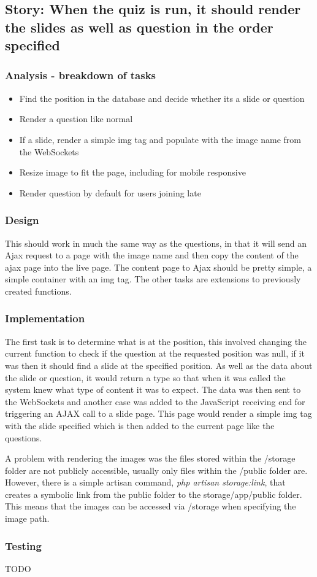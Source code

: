 \subsection{Story: When the quiz is run, it should render the slides as well as question in the order specified}
\subsubsection{Analysis - breakdown of tasks}
\begin{itemize}
	\item Find the position in the database and decide whether its a slide or question
	\item Render a question like normal
	\item If a slide, render a simple img tag and populate with the image name from the WebSockets
	\item Resize image to fit the page, including for mobile responsive
	\item Render question by default for users joining late
\end{itemize}
\subsubsection{Design}
This should work in much the same way as the questions, in that it will send an Ajax request to a page with the image name and then copy the content of the ajax page into the live page. The content page to Ajax should be pretty simple, a simple container with an img tag. The other tasks are extensions to previously created functions.
\subsubsection{Implementation}
The first task is to determine what is at the position, this involved changing the current function to check if the question at the requested position was null, if it was then it should find a slide at the specified position. As well as the data about the slide or question, it would return a type so that when it was called the system knew what type of content it was to expect. The data was then sent to the WebSockets and another case was added to the JavaScript receiving end for triggering an AJAX call to a slide page. This page would render a simple img tag with the slide specified which is then added to the current page like the questions.

A problem with rendering the images was the files stored within the /storage folder are not publicly accessible, usually only files within the /public folder are. However, there is a simple artisan command, \textit{php artisan storage:link}, that creates a symbolic link from the public folder to the storage/app/public folder. This means that the images can be accessed via /storage when specifying the image path.
\subsubsection{Testing}
TODO
\newpage